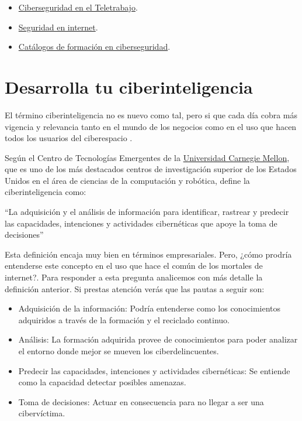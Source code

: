\documentclass[
  spanish,
  a4paper,
  openany]{book}
\begin{document}
\begin{itemize}
\item
  \href{https://learndigital.withgoogle.com/activate/course/cybersecurity-remote-work}{Ciberseguridad en el Teletrabajo}.
\item
  \href{https://www.cualifica2.es/cursos/Curso-Seguridad-En-Internet}{Seguridad en internet}.
\item
  \href{https://www.incibe.es/catalogos-formacion-ciberseguridad}{Catálogos de formación en ciberseguridad}.
\end{itemize}

\hypertarget{desarrolla-tu-ciberinteligencia}{%
\section{Desarrolla tu ciberinteligencia}\label{desarrolla-tu-ciberinteligencia}}

El término ciberinteligencia no es nuevo como tal, pero si que cada día cobra más vigencia y relevancia tanto en el mundo de los negocios como en el uso que hacen todos los usuarios del ciberespacio \citep{ciberinteligencia}.

Según el Centro de Tecnologías Emergentes de la \href{https://es.wikipedia.org/wiki/Universidad_Carnegie_Mellon}{Universidad Carnegie Mellon}, que es uno de los más destacados centros de investigación superior de los Estados Unidos en el área de ciencias de la computación y robótica, define la ciberinteligencia como:

``La adquisición y el análisis de información para identificar, rastrear y predecir las capacidades, intenciones y actividades cibernéticas que apoye la toma de decisiones''

Esta definición encaja muy bien en términos empresariales. Pero, ¿cómo prodría entenderse este concepto en el uso que hace el común de los mortales de internet?. Para responder a esta pregunta analicemos con más detalle la definición anterior. Si prestas atención verás que las pautas a seguir son:

\begin{itemize}
\item
  Adquisición de la información: Podría entenderse como los conocimientos adquiridos a través de la formación y el reciclado continuo.
\item
  Análisis: La formación adquirida provee de conocimientos para poder analizar el entorno donde mejor se mueven los ciberdelincuentes.
\item
  Predecir las capacidades, intenciones y actividades cibernéticas: Se entiende como la capacidad detectar posibles amenazas.
\item
  Toma de decisiones: Actuar en consecuencia para no llegar a ser una cibervíctima.
\end{itemize}
\end{document}
